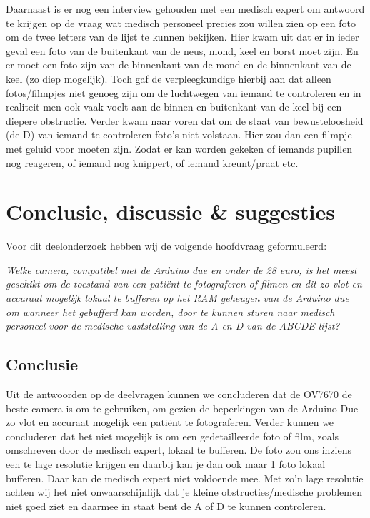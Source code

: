 \documentclass{article}
\begin{document}
Daarnaast is er nog een interview gehouden met een medisch expert om antwoord te krijgen op de vraag wat medisch personeel precies zou willen zien op een foto om de twee letters van de lijst te kunnen bekijken. Hier kwam uit dat er in ieder geval een foto van de buitenkant van de neus, mond, keel en borst moet zijn. En er moet een foto zijn van de binnenkant van de mond en de binnenkant van de keel (zo diep mogelijk). Toch gaf de verpleegkundige hierbij aan dat alleen fotos/filmpjes niet genoeg zijn om de luchtwegen van iemand te controleren en in realiteit men ook vaak voelt aan de binnen en buitenkant van de keel bij een diepere obstructie. Verder kwam naar voren dat om de staat van bewusteloosheid (de D) van iemand te controleren foto’s niet volstaan. Hier zou dan een filmpje met geluid voor moeten zijn. Zodat er kan worden gekeken of iemands pupillen nog reageren, of iemand nog knippert, of iemand kreunt/praat etc. 

\section{Conclusie, discussie \& suggesties}
Voor dit deelonderzoek hebben wij de volgende hoofdvraag geformuleerd:

\textit{Welke camera, compatibel met de Arduino due en onder de 28 euro, is het meest geschikt om de toestand van een patiënt te fotograferen of filmen en dit zo vlot en accuraat mogelijk lokaal te bufferen op het RAM geheugen van de Arduino due om wanneer het gebufferd kan worden, door te kunnen sturen naar medisch personeel voor de medische vaststelling van de A en D van de ABCDE lijst? }
\subsection{Conclusie}
Uit de antwoorden op de deelvragen kunnen we concluderen dat de OV7670 de beste camera is om te gebruiken, om gezien de beperkingen van de Arduino Due zo vlot en accuraat mogelijk een patiënt te fotograferen. Verder kunnen we concluderen dat het niet mogelijk is om een gedetailleerde foto of film, zoals omschreven door de medisch expert, lokaal te bufferen. De foto zou ons inziens een te lage resolutie krijgen en daarbij kan je dan ook maar 1 foto lokaal bufferen. Daar kan de medisch expert niet voldoende mee. Met zo’n lage resolutie achten wij het niet onwaarschijnlijk dat je kleine obstructies/medische problemen niet goed ziet en daarmee in staat bent de A of D te kunnen controleren.
\end{document}
